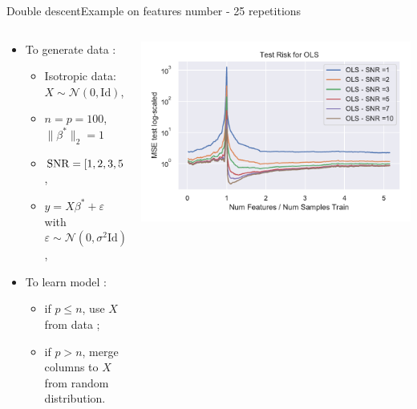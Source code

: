 \documentclass[10pt,aspectratio=43]{beamer}
\begin{document}
\begin{frame}{Double descent}{Example on features number - 25 repetitions}
    \begin{columns}
        \begin{column}{0.46\textwidth}
            \begin{itemize}
                \item To generate data :
                \begin{itemize}
                    \item Isotropic data: $X\sim\mathcal{N}(0,\mathrm{Id})$,
                    \item $n=p=100$,
                    $\|\beta^*\|_2=1$
                    \item $\operatorname{SNR} = [1, 2, 3, 5, 7, 10]$, \\
                    \item $y = X\beta^*+\varepsilon$ with $\varepsilon\sim \mathcal{N}(0, \sigma^2\mathrm{Id})$,
                \end{itemize}
                \item To learn model :
                \begin{itemize}
                    \item if $p\leq n$, use $X$ from data ;
                    \item if $p > n$, merge columns to $X$ from random distribution.
                \end{itemize}
            \end{itemize}
        \end{column}
        \begin{column}{0.7\textwidth}
            \begin{center}
             \includegraphics[width=1\textwidth]{ols_fail_log_snr_features.pdf}

\end{center}
\end{column}
\end{columns}
\end{frame}
\end{document}

